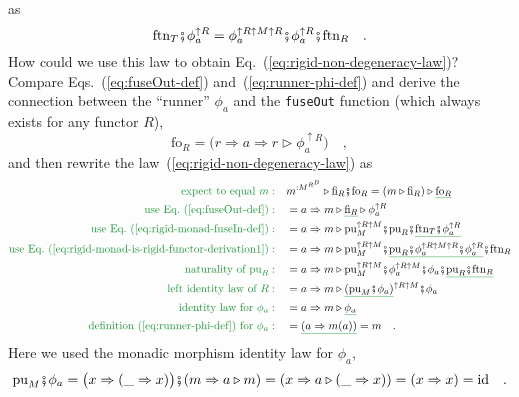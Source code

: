 as
\begin{equation}
\text{ftn}_{T}\bef\phi_{a}^{\uparrow R}=\phi_{a}^{\uparrow R\uparrow M\uparrow R}\bef\phi_{a}^{\uparrow R}\bef\text{ftn}_{R}\quad.\label{eq:rigid-monad-is-rigid-functor-derivation1}
\end{equation}
How could we use this law to obtain Eq.~(\ref{eq:rigid-non-degeneracy-law})?
Compare Eqs.~(\ref{eq:fuseOut-def}) and~(\ref{eq:runner-phi-def})
and derive the connection between the ``runner'' $\phi_{a}$ and
the \lstinline!fuseOut!
function (which always exists for any functor $R$),
\[
\text{fo}_{R}=\big(r\Rightarrow a\Rightarrow r\triangleright\phi_{a}^{\uparrow R}\big)\quad,
\]
and then rewrite the law~(\ref{eq:rigid-non-degeneracy-law}) as
\begin{align*}
{\color{greenunder}\text{expect to equal }m:}\quad & m^{:M^{R^{B}}}\triangleright\text{fi}_{R}\bef\text{fo}_{R}=\left(m\triangleright\text{fi}_{R}\right)\triangleright\gunderline{\text{fo}_{R}}\\
{\color{greenunder}\text{use Eq.~(\ref{eq:fuseOut-def})}:}\quad & =a\Rightarrow m\triangleright\gunderline{\text{fi}_{R}}\triangleright\phi_{a}^{\uparrow R}\\
{\color{greenunder}\text{use Eq.~(\ref{eq:rigid-monad-fuseIn-def})}:}\quad & =a\Rightarrow m\triangleright\text{pu}_{M}^{\uparrow R\uparrow M}\bef\text{pu}_{R}\bef\gunderline{\text{ftn}_{T}\bef\phi_{a}^{\uparrow R}}\\
{\color{greenunder}\text{use Eq.~(\ref{eq:rigid-monad-is-rigid-functor-derivation1})}:}\quad & =a\Rightarrow m\triangleright\text{pu}_{M}^{\uparrow R\uparrow M}\bef\gunderline{\text{pu}_{R}\bef\phi_{a}^{\uparrow R\uparrow M\uparrow R}\bef\phi_{a}^{\uparrow R}}\bef\text{ftn}_{R}\\
{\color{greenunder}\text{naturality of }\text{pu}_{R}:}\quad & =a\Rightarrow m\triangleright\text{pu}_{M}^{\uparrow R\uparrow M}\bef\phi_{a}^{\uparrow R\uparrow M}\bef\phi_{a}\bef\gunderline{\text{pu}_{R}\bef\text{ftn}_{R}}\\
{\color{greenunder}\text{left identity law of }R:}\quad & =a\Rightarrow m\triangleright\gunderline{(\text{pu}_{M}\bef\phi_{a})}^{\uparrow R\uparrow M}\bef\phi_{a}\\
{\color{greenunder}\text{identity law for }\phi_{a}:}\quad & =a\Rightarrow m\triangleright\gunderline{\phi_{a}}\\
{\color{greenunder}\text{definition~(\ref{eq:runner-phi-def}) for }\phi_{a}:}\quad & =\gunderline{\left(a\Rightarrow m(a)\right)}=m\quad.
\end{align*}
Here we used the monadic morphism identity law for $\phi_{a}$,
\[
\text{pu}_{M}\bef\phi_{a}=\big(x\Rightarrow(\_\Rightarrow x)\big)\bef(m\Rightarrow a\triangleright m)=\left(x\Rightarrow a\triangleright(\_\Rightarrow x)\right)=\left(x\Rightarrow x\right)=\text{id}\quad.
\]


